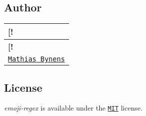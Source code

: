 \subsection*{Author}

\tabulinesep=1mm
\begin{longtabu} spread 0pt [c]{*{1}{|X[-1]}|}
\hline
\rowcolor{\tableheadbgcolor}\textbf{ \mbox{[}!   }\\
\endfirsthead
\hline
\endfoot
\hline
\rowcolor{\tableheadbgcolor}\textbf{ \mbox{[}!   }\\
\endhead
\href{https://mathiasbynens.be/}{\tt Mathias Bynens}   \\
\end{longtabu}


\subsection*{License}

{\itshape emoji-\/regex} is available under the \href{https://mths.be/mit}{\tt M\+IT} license. 